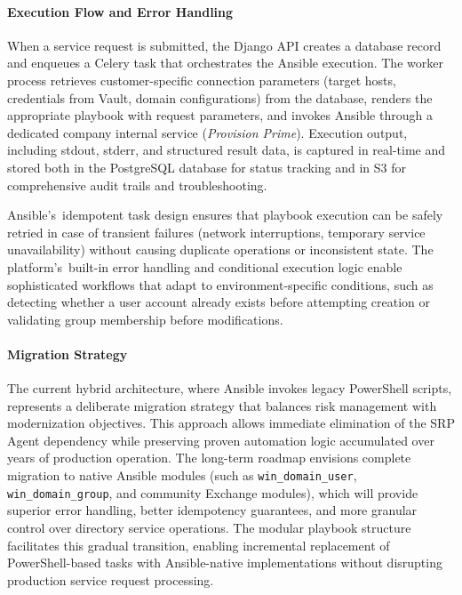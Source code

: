 \paragraph{Execution Flow and Error Handling}

When a service request is submitted, the Django API creates a database record and enqueues a Celery task that orchestrates the Ansible execution. The worker process retrieves customer-specific connection parameters (target hosts, credentials from Vault, domain configurations) from the database, renders the appropriate playbook with request parameters, and invokes Ansible through a dedicated company internal service (\textit{Provision Prime}). Execution output, including stdout, stderr, and structured result data, is captured in real-time and stored both in the PostgreSQL database for status tracking and in S3 for comprehensive audit trails and troubleshooting.

Ansible's~idempotent task design ensures that playbook execution can be safely retried in case of transient failures (network interruptions, temporary service unavailability) without causing duplicate operations or inconsistent state. The platform's~built-in error handling and conditional execution logic enable sophisticated workflows that adapt to environment-specific conditions, such as detecting whether a user account already exists before attempting creation or validating group membership before modifications.

\paragraph{Migration Strategy}

The current hybrid architecture, where Ansible invokes legacy PowerShell scripts, represents a deliberate migration strategy that balances risk management with modernization objectives. This approach allows immediate elimination of the SRP Agent dependency while preserving proven automation logic accumulated over years of production operation. The long-term roadmap envisions complete migration to native Ansible modules (such as \texttt{win\_domain\_user}, \texttt{win\_domain\_group}, and community Exchange modules), which will provide superior error handling, better idempotency guarantees, and more granular control over directory service operations. The modular playbook structure facilitates this gradual transition, enabling incremental replacement of PowerShell-based tasks with Ansible-native implementations without disrupting production service request processing.

